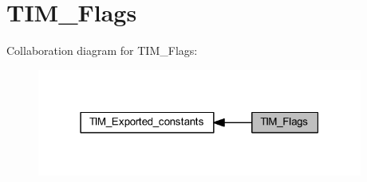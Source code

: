 \hypertarget{group___t_i_m___flags}{}\section{T\+I\+M\+\_\+\+Flags}
\label{group___t_i_m___flags}
Collaboration diagram for T\+I\+M\+\_\+\+Flags\+:
\nopagebreak
\begin{figure}[H]
\begin{center}
\leavevmode
\includegraphics[width=303pt]{group___t_i_m___flags}
\end{center}
\end{figure}
